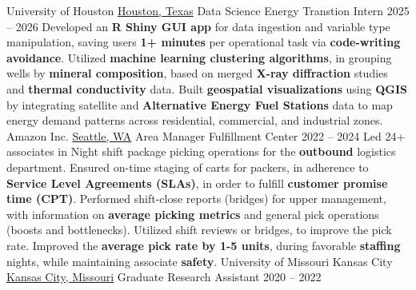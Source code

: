 \documentclass[9pt]{adeckcv} %
\begin{document}

\begin{entrylist}
    \entry
        {\large{University of Houston}} 
        {\href{https://www.google.com/maps/search/?api=1\&query=29.7215903,-95.34365}{Houston, Texas}}
        {\large{Data Science Energy Transtion Intern}}
        {2025 -- 2026}
        {\itemizeexperience
        {Developed an \textbf{R Shiny GUI app} for data ingestion and variable type manipulation, saving users \textbf{1+ minutes} per operational task via \textbf{code-writing avoidance}.}
        {Utilized \textbf{machine learning clustering algorithms}, in grouping wells by \textbf{mineral composition}, based on merged \textbf{X-ray diffraction} studies and \textbf{thermal conductivity} data.}
        {Built \textbf{geospatial visualizations} using \textbf{QGIS} by integrating satellite and \textbf{Alternative Energy Fuel Stations} data to map energy demand patterns across residential, commercial, and industrial zones.}
\faWindows\slashsep 
\faLinux\slashsep
\faApple{}\slashsep
{}\slashsep
\faPython{}\slashsep
}
\entry
{\large{Amazon Inc.}}
{\href{https://www.google.com/maps/search/?api=1\&query=47.6227501,-122.3367548}{Seattle, WA}}
{\large{Area Manager Fulfillment Center}}
{2022 -- 2024}
{\itemizeexperience
  {Led 24+ associates in Night shift package picking operations for the \textbf{outbound} logistics department. Ensured on-time staging of carts for packers, in adherence to \textbf{Service Level Agreements (SLAs)}, in order to fulfill \textbf{customer promise time (CPT)}.}
  {Performed shift-close reports (bridges) for upper management, with information on \textbf{average picking metrics} and general pick operations (boosts and bottlenecks).}
  {Utilized shift reviews or bridges, to improve the pick rate. Improved the \textbf{average pick rate by 1-5 units}, during favorable \textbf{staffing} nights, while maintaining associate \textbf{safety}.}
  \faAmazon\slashsep
  \faWarehouse\slashsep
  \faBox{}\slashsep
  \faDolly{}\slashsep
  \faTruck{}
}
\entry
{\large{University of Missouri Kansas City}}
{\href{https://www.google.com/maps/search/?api=1\&query=39.0349318,-94.5745504}{Kansas City, Missouri}}
{\large{Graduate Research Assistant}}
{2020 -- 2022}

\end{entrylist}
\end{document}
